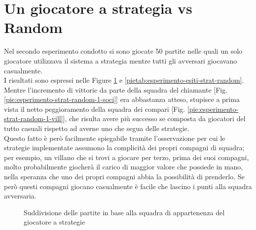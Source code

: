 \section{Un giocatore a strategia vs Random}

Nel secondo esperimento condotto si sono giocate 50 partite nelle quali un solo giocatore utilizzava il sistema a strategia mentre tutti gli avversari giocavano casualmente.\\
I risultati sono espressi nelle Figure \ref{pietab:esperimento-esiti-strat-random-altro} e \ref{pietab:esperimento-esiti-strat-random}.\\
Mentre l'incremento di vittorie da parte della squadra del chiamante [Fig. \ref{pie:esperimento-strat-random-1-soci}] era abbastanza atteso, stupisce a prima vista il netto peggioramento della squadra dei compari [Fig. \ref{pie:esperimento-strat-random-1-vill}], che risulta avere più successo se composta da giocatori del tutto casuali rispetto ad averne uno che segua delle strategie.\\
Questo fatto è però facilmente spiegabile tramite l'osservazione per cui le strategie implementate assumono la complicità dei propri compagni di squadra; per esempio, un villano che si trovi a giocare per terzo, prima dei suoi compagni, molto probabilmente giocherà il carico di maggior valore che possiede in mano, nella speranza che uno dei propri compagni abbia la possibilità di prenderlo.
Se però questi compagni giocano casualmente è facile che lascino i punti alla squadra avversaria.


\begin{figure}[!htb]
\centering

\caption{Suddivisione delle partite in base alla squadra di appartenenza del giocatore a strategie} \label{pietab:esperimento-esiti-strat-random-altro}
\end{figure}



